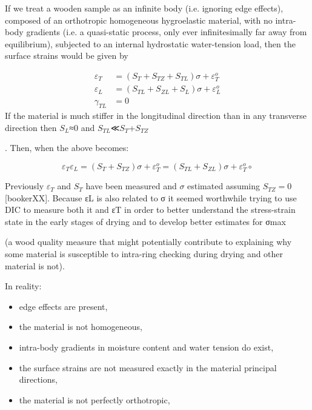 If we treat a wooden sample as an infinite body (i.e. ignoring edge effects), composed of an orthotropic homogeneous hygroelastic material, with no intra-body gradients (i.e. a quasi-static process, only ever infinitesimally far away from equilibrium), subjected to an internal hydrostatic water-tension load, then the surface strains would be given by

\begin {eqnarray}
\varepsilon_T &=(S_T+S_{TZ}+S_{TL}) \sigma +\varepsilon^o_T\\
\varepsilon_L &=(S_{TL}+S_{ZL}+S_L) \sigma +\varepsilon^o_L\\
\gamma_{TL} &=0
\end{eqnarray}
If the material is much stiffer in the longitudinal direction than in any transverse direction then $S_L$≈0
and $S_{TL}$≪$S_T$+$S_{TZ}$

. Then, when the above becomes:

$$\varepsilon_T \varepsilon_L = (S_T+S_{TZ})\sigma + \varepsilon^o_T = \left(S_{TL}+S_{ZL}\right) \sigma + \varepsilon^o_T∘$$

Previously $\varepsilon_T$ and $S_T$ have been measured and $\sigma$ estimated assuming $S_{TZ}=0$ [bookerXX]. Because εL is also related to σ it seemed worthwhile trying to use DIC to measure both it and εT in order to better understand the stress-strain state in the early stages of drying and to develop better estimates for σmax

(a wood quality measure that might potentially contribute to explaining why some material is susceptible to intra-ring checking during drying and other material is not).

In reality:

   \begin{itemize}
\item  edge effects are present,
\end{itemize}
\begin{itemize}
\item     the material is not homogeneous,
\end{itemize}
\begin{itemize}
\item     intra-body gradients in moisture content and water tension do exist,
\end{itemize}
\begin{itemize}
\item     the surface strains are not measured exactly in the material principal directions,
\end{itemize}
\begin{itemize}
\item     the material is not perfectly orthotropic,
\end{itemize}